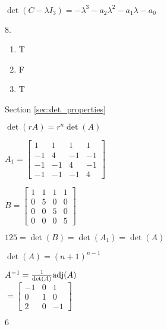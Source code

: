 \begin{multicols}{2}
\item $\det(C - \lambda I_3) = -\lambda^3 -a_2 \lambda^2 - a_1 \lambda - a_0$


\ea

\oee

\be
\item[8.]
\begin{enumerate}[label=(\alph*), leftmargin=1\parindent]
\item T
\item F
\item T
\end{enumerate}



\ee

\hspace{-0.25in} Section \ref{sec:det_properties}

\obe
\item $\det(rA) = r^{n} \det(A)$

\item 
\ba
\item  $A_1=  \left[ \begin{array}{rrrr} 1&1&1&1 \\ -1&4&-1&-1\\ -1&-1&4&-1\\ -1&-1&-1&4 \end{array} \right]$

\item $B=  \left[ \begin{array}{cccc} 1&1&1&1 \\ 0&5&0&0\\ 0&0&5&0\\ 0&0&0&5 \end{array} \right]$

\item $125 = \det(B) = \det(A_1) = \det(A)$

\item $\det(A) =  (n+1)^{n-1}$

\ea

\item $A^{-1} = \frac{1}{\det(A)} \text{adj}(A)$ \\
$ = \left[ \begin{array}{rcr} -1&0&1 \\ 0&1&0 \\ 2&0&-1 \end{array} \right]$

\item 
\ba
\item $6$ 


\end{multicols}
